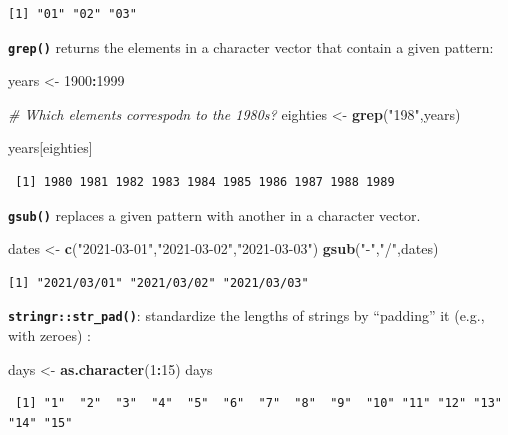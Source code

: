 \documentclass[
]{book}
\newenvironment{Shaded}{\begin{snugshade}}{\end{snugshade}}
\newcommand{\CommentTok}[1]{\textcolor[rgb]{0.56,0.35,0.01}{\textit{#1}}}
\newcommand{\DecValTok}[1]{\textcolor[rgb]{0.00,0.00,0.81}{#1}}
\newcommand{\KeywordTok}[1]{\textcolor[rgb]{0.13,0.29,0.53}{\textbf{#1}}}
\newcommand{\NormalTok}[1]{#1}
\newcommand{\OperatorTok}[1]{\textcolor[rgb]{0.81,0.36,0.00}{\textbf{#1}}}
\newcommand{\StringTok}[1]{\textcolor[rgb]{0.31,0.60,0.02}{#1}}
\begin{document}
\begin{verbatim}
[1] "01" "02" "03"
\end{verbatim}

\textbf{\texttt{grep()}} returns the elements in a character vector that contain a given pattern:

\begin{Shaded}
\begin{Highlighting}[]
\NormalTok{years <-}\StringTok{ }\DecValTok{1900}\OperatorTok{:}\DecValTok{1999}

\CommentTok{# Which elements correspodn to the 1980s?}
\NormalTok{eighties <-}\StringTok{ }\KeywordTok{grep}\NormalTok{(}\StringTok{"198"}\NormalTok{,years)}

\NormalTok{years[eighties]}
\end{Highlighting}
\end{Shaded}

\begin{verbatim}
 [1] 1980 1981 1982 1983 1984 1985 1986 1987 1988 1989
\end{verbatim}

\textbf{\texttt{gsub()}} replaces a given pattern with another in a character vector.

\begin{Shaded}
\begin{Highlighting}[]
\NormalTok{dates <-}\StringTok{ }\KeywordTok{c}\NormalTok{(}\StringTok{"2021-03-01"}\NormalTok{,}\StringTok{"2021-03-02"}\NormalTok{,}\StringTok{"2021-03-03"}\NormalTok{)}
\KeywordTok{gsub}\NormalTok{(}\StringTok{"-"}\NormalTok{,}\StringTok{"/"}\NormalTok{,dates)}
\end{Highlighting}
\end{Shaded}

\begin{verbatim}
[1] "2021/03/01" "2021/03/02" "2021/03/03"
\end{verbatim}

\textbf{\texttt{stringr::str\_pad()}}: standardize the lengths of strings by ``padding'' it (e.g., with zeroes) :

\begin{Shaded}
\begin{Highlighting}[]
\NormalTok{days <-}\StringTok{ }\KeywordTok{as.character}\NormalTok{(}\DecValTok{1}\OperatorTok{:}\DecValTok{15}\NormalTok{)}
\NormalTok{days}
\end{Highlighting}
\end{Shaded}

\begin{verbatim}
 [1] "1"  "2"  "3"  "4"  "5"  "6"  "7"  "8"  "9"  "10" "11" "12" "13" "14" "15"
\end{verbatim}
\end{document}
